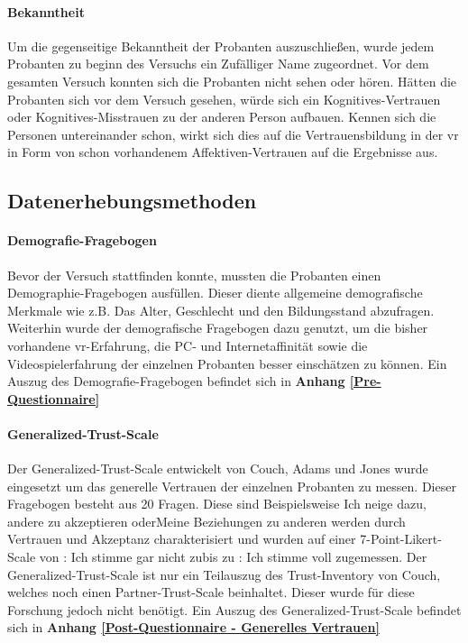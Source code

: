 \documentclass[a4paper,11pt]{article}%
\renewcommand{\\}{\vspace*{0.5\baselineskip} \newline}
\begin{document}
			\paragraph{Bekanntheit}
Um die gegenseitige Bekanntheit der Probanten auszuschließen, wurde jedem Probanten zu beginn des Versuchs ein Zufälliger Name zugeordnet. Vor dem gesamten Versuch konnten sich die Probanten nicht sehen oder hören.
Hätten die Probanten sich vor dem Versuch gesehen, würde sich ein Kognitives-Vertrauen oder Kognitives-Misstrauen zu der anderen Person aufbauen. 
Kennen sich die Personen untereinander schon, wirkt sich dies auf die Vertrauensbildung in der \ac{vr} in Form von schon vorhandenem Affektiven-Vertrauen auf die Ergebnisse aus.
			
	

	\subsection{Datenerhebungsmethoden}
			
		\paragraph{Demografie-Fragebogen}
Bevor der Versuch stattfinden konnte, mussten die Probanten einen Demographie-Fragebogen ausfüllen. Dieser diente allgemeine demografische Merkmale wie z.B. Das Alter, Geschlecht und den Bildungsstand abzufragen. Weiterhin wurde der demografische Fragebogen dazu genutzt, um die bisher vorhandene \ac{vr}-Erfahrung, die PC- und Internetaffinität sowie die Videospielerfahrung der einzelnen Probanten besser einschätzen zu können.
\\Ein Auszug des Demografie-Fragebogen befindet sich in \textbf{Anhang \ref{Pre-Questionnaire}}

		\paragraph{Generalized-Trust-Scale}
Der Generalized-Trust-Scale entwickelt von Couch, Adams und Jones \citep{couch1996assessment} wurde eingesetzt um das generelle Vertrauen der einzelnen Probanten zu messen.
Dieser Fragebogen besteht aus 20 Fragen. Diese sind Beispielsweise \flqq Ich neige dazu, andere zu akzeptieren \frqq oder\flqq Meine Beziehungen zu anderen werden durch Vertrauen und Akzeptanz charakterisiert \frqq und wurden auf einer 7-Point-Likert-Scale von : Ich stimme gar nicht zu\frqq bis zu  : Ich stimme voll zu\frqq gemessen. Der Generalized-Trust-Scale ist nur ein Teilauszug des \flqq Trust-Inventory von Couch\frqq, welches noch einen \flqq Partner-Trust-Scale \frqq beinhaltet. Dieser wurde für diese Forschung jedoch nicht benötigt. 
\\Ein Auszug des Generalized-Trust-Scale befindet sich in \textbf{Anhang \ref{Post-Questionnaire - Generelles Vertrauen}}
\end{document}
